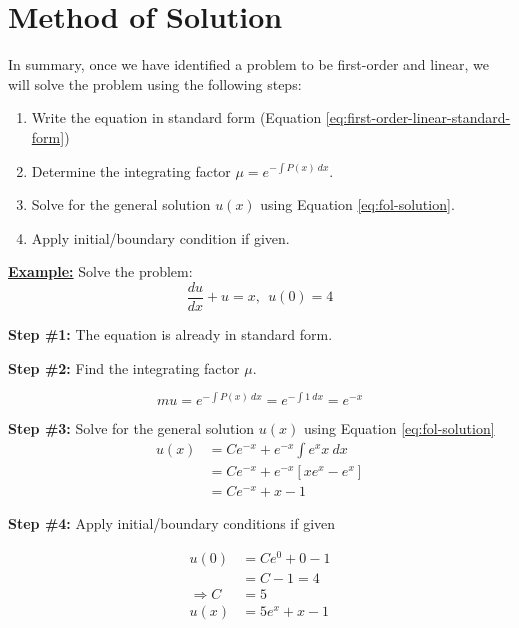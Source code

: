 \section{Method of Solution} 
In summary, once we have identified a problem to be first-order and linear, we will solve the problem using the following steps:
\begin{enumerate}
\item Write the equation in standard form (Equation \ref{eq:first-order-linear-standard-form})
\item Determine the integrating factor $\mu = e^{-\int P(x) \ dx}$.
\item Solve for the general solution $u(x)$ using Equation \ref{eq:fol-solution}.
\item Apply initial/boundary condition if given.
\end{enumerate}

\vspace{1cm}
\underline{\textbf{Example:}}
Solve the problem:
$$\frac{du}{dx}+u=x, \ \ u(0) = 4$$

\textbf{Step \#1:}
The equation is already in standard form.

\vspace{0.25cm}
\textbf{Step \#2:} Find the integrating factor $\mu$.

$$mu = e^{-\int P(x) \ dx} = e^{-\int 1 \ dx} = e^{-x}$$

\vspace{0.25cm}
\textbf{Step \#3:} Solve for the general solution $u(x)$ using Equation \ref{eq:fol-solution}
\begin{align*}
u(x) &= Ce^{-x}+e^{-x}\int e^{x}x \ dx \\
&= Ce^{-x} + e^{-x}\left[xe^{x}-e^{x} \right] \\
&= Ce^{-x} + x - 1
\end{align*}

\vspace{0.25cm}
\textbf{Step \#4:} Apply initial/boundary conditions if given

\begin{align*}
u(0) &= Ce^{0} + 0 -1 \\
 &=C-1 = 4 \\
 \Rightarrow C &= 5 \\
 u(x) &= 5e^x+x-1
\end{align*}



